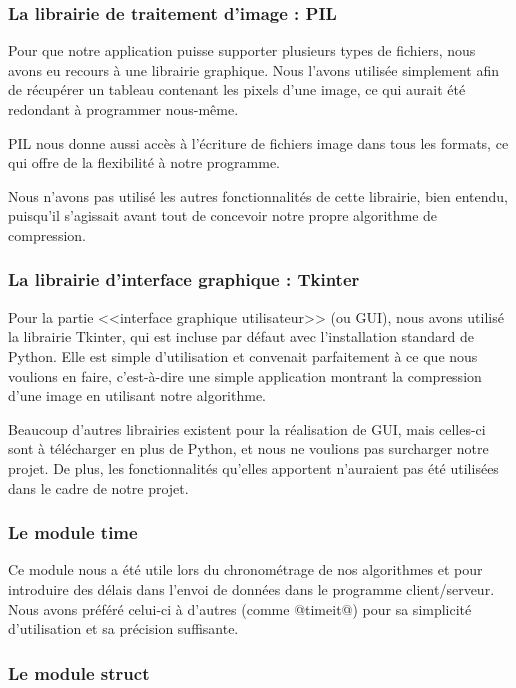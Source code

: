 \documentclass{article}
\begin{document}
\subsubsection{La librairie de traitement d'image : PIL}

Pour que notre application puisse supporter plusieurs types de fichiers, nous avons eu recours à une librairie graphique. Nous l'avons utilisée simplement afin de récupérer un tableau contenant les pixels d'une image, ce qui aurait été redondant à programmer nous-même.

PIL nous donne aussi accès à l'écriture de fichiers image dans tous les formats, ce qui offre de la flexibilité à notre programme.

Nous n'avons pas utilisé les autres fonctionnalités de cette librairie, bien entendu, puisqu'il s'agissait avant tout de concevoir notre propre algorithme de compression.

\subsubsection{La librairie d'interface graphique : Tkinter}

Pour la partie <<interface graphique utilisateur>> (ou GUI), nous avons utilisé la librairie Tkinter, qui est incluse par défaut avec l'installation standard de Python. Elle est simple d'utilisation et convenait parfaitement à ce que nous voulions en faire, c'est-à-dire une simple application montrant la compression d'une image en utilisant notre algorithme.

Beaucoup d'autres librairies existent pour la réalisation de GUI, mais celles-ci sont à télécharger en plus de Python, et nous ne voulions pas surcharger notre projet. De plus, les fonctionnalités qu'elles apportent n'auraient pas été utilisées dans le cadre de notre projet.

\subsubsection{Le module time}

Ce module nous a été utile lors du chronométrage de nos algorithmes et pour introduire des délais dans l'envoi de données dans le programme client/serveur. Nous avons préféré celui-ci à d'autres (comme @timeit@) pour sa simplicité d'utilisation et sa précision suffisante.

\subsubsection{Le module struct}
\end{document}
